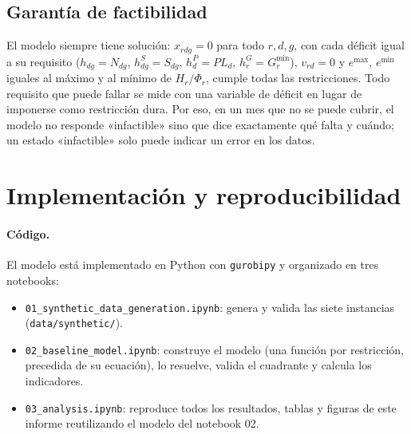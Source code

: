 \subsection{Garantía de factibilidad}

El modelo siempre tiene solución: $x_{rdg} = 0$ para todo $r, d, g$, con cada déficit igual a su requisito ($h_{dg} = N_{dg}$, $h^{S}_{dg} = S_{dg}$, $h^{P}_{d} = PL_d$, $h^{G}_{r} = G^{\min}_r$), $v_{rd} = 0$ y $e^{\max}$, $e^{\min}$ iguales al máximo y al mínimo de $H_r / \Phi_r$, cumple todas las restricciones. Todo requisito que puede fallar se mide con una variable de déficit en lugar de imponerse como restricción dura. Por eso, en un mes que no se puede cubrir, el modelo no responde «infactible» sino que dice exactamente qué falta y cuándo; un estado «infactible» solo puede indicar un error en los datos.

\section{Implementación y reproducibilidad}
\label{sec:impl}

\paragraph{Código.} El modelo está implementado en Python con \texttt{gurobipy} y organizado en tres notebooks:
\begin{itemize}
  \item \texttt{01\_synthetic\_data\_generation.ipynb}: genera y valida las siete instancias (\texttt{data/synthetic/}).
  \item \texttt{02\_baseline\_model.ipynb}: construye el modelo (una función por restricción, precedida de su ecuación), lo resuelve, valida el cuadrante y calcula los indicadores.
  \item \texttt{03\_analysis.ipynb}: reproduce todos los resultados, tablas y figuras de este informe reutilizando el modelo del notebook 02.
\end{itemize}

